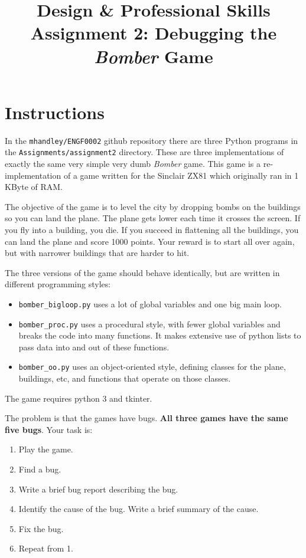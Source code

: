 \documentclass{article}
\title{Design \& Professional Skills\\
  Assignment 2: Debugging the {\em Bomber} Game}
\author{}
\date{}
\begin{document}
\maketitle

\section*{Instructions}

In the {\tt mhandley/ENGF0002} github repository there are three
Python programs in the {\tt Assignments/assignment2} directory.  These
are three implementations of exactly the same very simple very dumb
{\em Bomber} game. This game is a re-implementation of a game written for
the Sinclair ZX81 which originally ran in 1 KByte of RAM.

The objective of the game is to level the city by dropping bombs on
the buildings so you can land the plane.  The plane gets lower each
time it crosses the screen.  If you fly into a building, you die.  If
you succeed in flattening all the buildings, you can land the plane
and score 1000 points.  Your reward is to start all over again, but
with narrower buildings that are harder to hit.  

The three versions of the game should behave identically, but are written in different programming styles:
\begin{itemize}
\item {\tt bomber\_bigloop.py} uses a lot of global variables and one big main loop.
\item{\tt bomber\_proc.py} uses a procedural style, with fewer global variables and breaks the code into many functions.  It makes extensive use of python lists to pass data into and out of these functions.
\item{\tt bomber\_oo.py} uses an object-oriented style, defining classes for the plane, buildings, etc, and functions that operate on those classes.
\end{itemize}
The game requires python 3 and tkinter.

The problem is that the games have bugs.  \textbf{All three games have the same five bugs}.  Your task is:
\begin{enumerate}
\item Play the game.
\item Find a bug.
\item Write a brief bug report describing the bug.
\item Identify the cause of the bug.  Write a brief summary of the cause.
\item Fix the bug.
\item Repeat from 1.
\end{enumerate}
\end{document}
